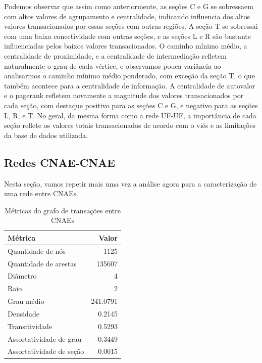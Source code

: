 Podemos observar que assim como anteriormente, as seções C e G se sobressaem com altos valores de agrupamento e centralidade, indicando influencia dos altos valores transacionados por essas seções com outras regiões. A seção T se sobressai com uma baixa conectividade com outras seções, e as seções L e R são bastante influenciadas pelos baixos valores transacionados. O caminho mínimo médio, a centralidade de proximidade, e a centralidade de intermediação refletem naturalmente o grau de cada vértice, e observamos pouca variância ao analisarmos o caminho mínimo médio ponderado, com exceção da seção T, o que também acontece para a centralidade de informação. A centralidade de autovalor e o pagerank refletem novamente a magnitude dos valores transacionados por cada seção, com destaque positivo para as seções C e G, e negativo para as seções L, R, e T. No geral, da mesma forma como a rede UF-UF, a importância de cada seção reflete os valores totais transacionados de acordo com o viés e as limitações da base de dados utilizada.

\subsection{Redes CNAE-CNAE}
\label{section:metricas-redes:cnae}

Nesta seção, vamos repetir mais uma vez a análise agora para a caracterização de uma rede entre CNAEs.

\begin{table}[htb]
\centering
\caption{Métricas do grafo de transações entre CNAEs}
\label{tab:metricas-redes:grafo-por-cnae}
    \begin{tabular}{l|r}
    \toprule
    Métrica &  Valor \\
    \midrule
    Quantidade de nós         &   1125      \\
    Quantidade de arestas     & 135607      \\
    Diâmetro                  &      4      \\
    Raio                      &      2      \\
    Grau médio                &    241.0791 \\
    Densidade                 &      0.2145 \\
    Transitividade            &      0.5293 \\
    Assortatividade de grau   &     -0.3449 \\
    Assortatividade de seção &       0.0015 \\
    \bottomrule
    \end{tabular}
\fdadospesquisa
\end{table}


